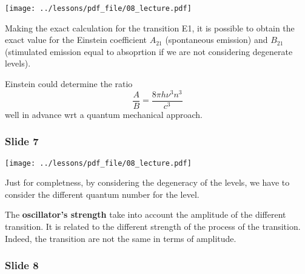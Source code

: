 \documentclass[../main/main.tex]{subfiles}
\begin{document}
\begin{minipage}[]{0.5\linewidth}
\centering
\texttt{[image: ../lessons/pdf\_file/08\_lecture.pdf]}
\end{minipage}
\hspace{0.3cm}
\vspace{0.3cm}
\begin{minipage}[c]{0.47\linewidth}

Making the exact calculation for the transition E1, it is possible to obtain the exact value for the Einstein coefficient \( A_{21} \) (spontaneous emission) and \( B_{21} \) (stimulated emission equal to absoprtion if we are not considering degenerate levels).

Einstein could determine the ratio
\begin{equation*}
  \frac{A}{B} = \frac{8 \pi h \nu ^3 n^3}{c^3}
\end{equation*}
well in advance wrt a quantum mechanical approach.

\end{minipage}

\newpage

\subsubsection*{Slide 7}

\begin{minipage}[]{0.5\linewidth}
\centering
\texttt{[image: ../lessons/pdf\_file/08\_lecture.pdf]}
\end{minipage}
\hspace{0.3cm}
\vspace{0.3cm}
\begin{minipage}[c]{0.47\linewidth}

Just for completness, by considering the degeneracy of the levels, we have to consider the different quantum number for the level.

The \textbf{oscillator's strength} take into account the amplitude of the different transition. It is related to the different strength of the process of the transition. Indeed, the transition are not the same in terms of amplitude.

\end{minipage}

\subsubsection*{Slide 8}
\end{document}

